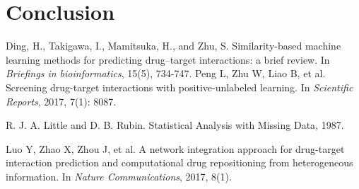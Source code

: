 \documentclass[sigconf,anonymous]{acmart}
\begin{document}
\section{Conclusion}\label{sec:conclusion}


\begin{thebibliography}{10}
Ding, H., Takigawa, I., Mamitsuka, H., and Zhu, S. 
\newblock Similarity-based machine learning methods for predicting drug–target interactions: a brief review. \newblock In {\em Briefings in bioinformatics}, 15(5), 734-747.
Peng L, Zhu W, Liao B, et al. 
\newblock Screening drug-target interactions with positive-unlabeled learning. 
\newblock In {\em Scientific Reports}, 2017, 7(1): 8087.

R. J. A. Little and D. B. Rubin. 
\newblock Statistical Analysis with Missing Data, 1987.

Luo Y, Zhao X, Zhou J, et al. 
\newblock A network integration approach for drug-target interaction prediction and computational drug repositioning from heterogeneous information. 
\newblock In {\em Nature Communications}, 2017, 8(1).

\end{thebibliography}
\end{document}
